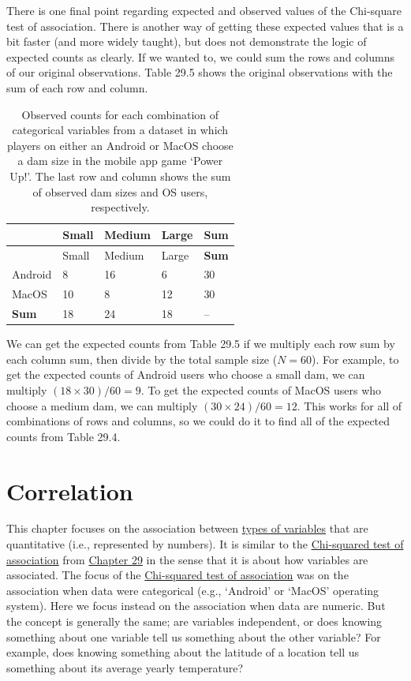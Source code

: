 \documentclass[
]{scrbook}
\begin{document}
There is one final point regarding expected and observed values of the Chi-square test of association.
There is another way of getting these expected values that is a bit faster (and more widely taught), but does not demonstrate the logic of expected counts as clearly.
If we wanted to, we could sum the rows and columns of our original observations.
Table 29.5 shows the original observations with the sum of each row and column.

\begin{longtable}[]{@{}lllll@{}}
\caption{\label{tab:unnamed-chunk-144}Observed counts for each combination of categorical variables from a dataset in which players on either an Android or MacOS choose a dam size in the mobile app game `Power Up!'. The last row and column shows the sum of observed dam sizes and OS users, respectively.}\tabularnewline
\toprule
& Small & Medium & Large & \textbf{Sum} \\
\midrule
\endfirsthead
\toprule
& Small & Medium & Large & \textbf{Sum} \\
\midrule
\endhead
Android & 8 & 16 & 6 & 30 \\
MacOS & 10 & 8 & 12 & 30 \\
\textbf{Sum} & 18 & 24 & 18 & -- \\
\bottomrule
\end{longtable}

We can get the expected counts from Table 29.5 if we multiply each row sum by each column sum, then divide by the total sample size (\(N = 60\)).
For example, to get the expected counts of Android users who choose a small dam, we can multiply \((18 \times 30)/60 = 9\).
To get the expected counts of MacOS users who choose a medium dam, we can multiply \((30 \times 24)/60 = 12\).
This works for all of combinations of rows and columns, so we could do it to find all of the expected counts from Table 29.4.

\hypertarget{Chapter_30}{%
\chapter{Correlation}\label{Chapter_30}}

This chapter focuses on the association between \protect\hyperlink{Chapter_5}{types of variables} that are quantitative (i.e., represented by numbers).
It is similar to the \protect\hyperlink{chi-squared-test-of-association}{Chi-squared test of association} from \protect\hyperlink{Chapter_29}{Chapter 29} in the sense that it is about how variables are associated.
The focus of the \protect\hyperlink{chi-squared-test-of-association}{Chi-squared test of association} was on the association when data were categorical (e.g., `Android' or `MacOS' operating system).
Here we focus instead on the association when data are numeric.
But the concept is generally the same; are variables independent, or does knowing something about one variable tell us something about the other variable?
For example, does knowing something about the latitude of a location tell us something about its average yearly temperature?
\end{document}
